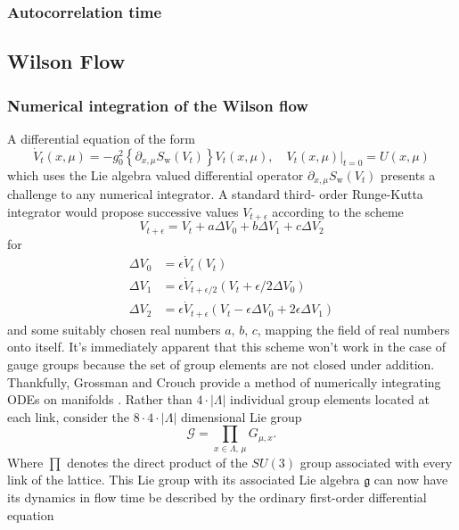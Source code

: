 \documentclass[a4paper,10pt]{article}
\begin{document}
\subsubsection{Autocorrelation time}
\subsection{Wilson Flow}

\subsubsection{Numerical integration of the Wilson flow}
A differential equation of the form 
\begin{equation}\label{eq:WF_diffeq}
\dot{V}_{t}(x, \mu)=-g_{0}^{2}\left\{\partial_{x, \mu} S_{\mathrm{w}}\left(V_{t}\right)\right\} V_{t}(x, \mu),\left.\quad V_{t}(x, \mu)\right|_{t=0}=U(x, \mu)
\end{equation}
which uses the Lie algebra valued differential operator $\partial_{x, \mu} S_{\mathrm{w}}\left(V_{t}\right)$ presents a challenge to any numerical integrator. A standard third- order Runge-Kutta integrator would  propose successive values $V_{t+\epsilon}$ according to the scheme 
$$
V_{t+\epsilon} = V_{t}+a\Delta V_0+b\Delta V_1 + c\Delta V_2
$$
for
\begin{equation*}
\begin{aligned} 
\Delta V_0 &= \epsilon \dot{V}_{t}\left( V_{t} \right)\\
\Delta V_1 &= \epsilon \dot{V}_{t+\epsilon/2}\left( V_{t} +\epsilon/2 \Delta V_0\right)\\
\Delta V_2 &= \epsilon \dot{V}_{t+\epsilon}\left( V_{t} -\epsilon \Delta V_0 + 2\epsilon\Delta V_1 \right)
\end{aligned}
\end{equation*}
and some suitably chosen real numbers $a,\,b,\,c$, mapping the field of real numbers onto itself. It's immediately apparent that this scheme won't work in the case of gauge groups because the set of group elements are not closed under addition.\\Thankfully, Grossman and Crouch provide a method of numerically integrating ODEs on manifolds \cite{CrouchP.E.1993Nioo}. Rather than $4\cdot\left| \Lambda \right|$ individual group elements located at each link, consider the $8\cdot4\cdot\left| \Lambda \right|$ dimensional Lie group $$\mathcal{G} =\prod\limits_{x\in \Lambda ,\,\mu}\!\!\!G_{\mu,x}.$$ Where $\prod$ denotes the direct product of the $SU(3)$ group associated with every link of the lattice. This Lie group with its associated Lie algebra $\mathfrak{g}$ can now have its dynamics in flow time be described by the ordinary first-order differential equation
\end{document}
